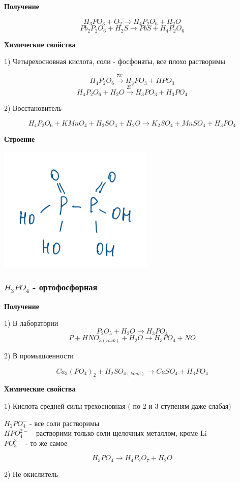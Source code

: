 \textbf{Получение}

$$H_3PO_3 + O_2 \rightarrow H_4P_2O_6 + H_2O$$
$$Pb_2P_2O_6 + H_2S \rightarrow PbS + H_4P_2O_6$$

\textbf{Химические свойства}

1) Четырехосновная кислота, соли - фосфонаты, все плохо растворимы

$$H_4P_2O_6 \xrightarrow{73^{\circ}} H_3PO_3+ HPO_3$$
$$H_4P_2O_6 + H_2O \xrightarrow{25^{\circ}} H_3PO_3 + H_3PO_4$$

2) Восстановитель

$$H_4P_2O_6 + KMnO_4 + H_2SO_4 + H_2O \rightarrow K_2SO_4 + MnSO_4+ H_3PO_4$$

\textbf{Строение}

\includegraphics{images/9v10.png}

\subsubsection*{$H_3PO_4$ - ортофосфорная}

\textbf{Получение}

1) В лаборатории
$$P_2O_5 + H_2O \rightarrow H_3PO_4$$
$$P + HNO_{3(razb)} + H_2O \rightarrow H_3PO_4 + NO$$

2) В промышленности

$$Ca_3(PO_4)_2 + H_2SO_{4(konc)} \rightarrow  CaSO_4 + H_3PO_4$$

\textbf{Химические свойства}

1) Кислота средней силы трехосновная ( по 2 и 3 ступеням даже слабая)

$H_2PO_4^-$ - все соли растворимы\\
$HPO_4^{2-}$ - растворими только соли щелочных металлом, кроме Li\\
$PO_3^{3-}$ - то же самое

$$H_3PO_4 \rightarrow H_4P_2O_7 + H_2O$$

2) Не окислитель

